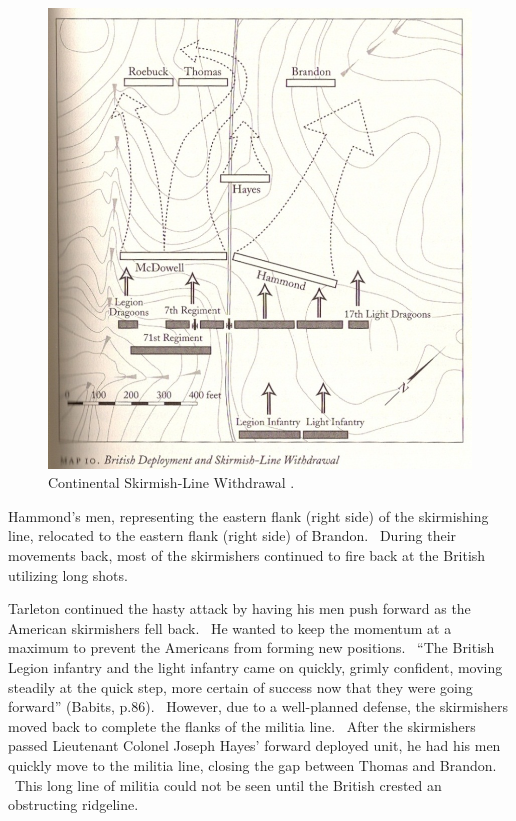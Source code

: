 \begin{figure}[ht]
    \begin{center}
    \includegraphics[width=\textwidth]{gfx/beiber04}
    \end{center}
    \caption{Continental Skirmish-Line Withdrawal \cite[85]{babits_devil_2001}.}
    \label{beiber04}
\end{figure}



Hammond’s men, representing the eastern flank (right side) of the skirmishing
line, relocated to the eastern flank (right side) of Brandon.  During their
movements back, most of the skirmishers continued to fire back at the British
utilizing long shots.

Tarleton continued the hasty attack by having his men push forward as the
American skirmishers fell back.  He wanted to keep the momentum at a maximum to
prevent the Americans from forming new positions.  “The British Legion infantry
and the light infantry came on quickly, grimly confident, moving steadily at the
quick step, more certain of success now that they were going forward” (Babits,
p.86).  However, due to a well-planned defense, the skirmishers moved back to
complete the flanks of the militia line.  After the skirmishers passed
Lieutenant Colonel Joseph Hayes’ forward deployed unit, he had his men quickly
move to the militia line, closing the gap between Thomas and Brandon.  This long
line of militia could not be seen until the British crested an obstructing
ridgeline.  


